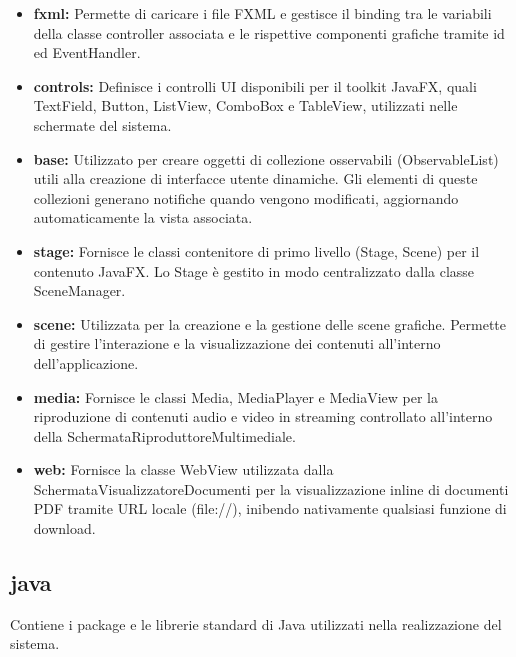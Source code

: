 \documentclass[12pt,a4paper]{article}
\begin{document}
\begin{itemize}
  \item \textbf{fxml:} Permette di caricare i file FXML e gestisce il binding tra le variabili della classe controller associata e le rispettive componenti grafiche tramite id ed EventHandler.
  \item \textbf{controls:} Definisce i controlli UI disponibili per il toolkit JavaFX, quali TextField, Button, ListView, ComboBox e TableView, utilizzati nelle schermate del sistema.
  \item \textbf{base:} Utilizzato per creare oggetti di collezione osservabili (ObservableList) utili alla creazione di interfacce utente dinamiche. Gli elementi di queste collezioni generano notifiche quando vengono modificati, aggiornando automaticamente la vista associata.
  \item \textbf{stage:} Fornisce le classi contenitore di primo livello (Stage, Scene) per il contenuto JavaFX. Lo Stage è gestito in modo centralizzato dalla classe SceneManager.
  \item \textbf{scene:} Utilizzata per la creazione e la gestione delle scene grafiche. Permette di gestire l'interazione e la visualizzazione dei contenuti all'interno dell'applicazione.
  \item \textbf{media:} Fornisce le classi Media, MediaPlayer e MediaView per la riproduzione di contenuti audio e video in streaming controllato all'interno della SchermataRiproduttoreMultimediale.
  \item \textbf{web:} Fornisce la classe WebView utilizzata dalla SchermataVisualizzatoreDocumenti per la visualizzazione inline di documenti PDF tramite URL locale (file://), inibendo nativamente qualsiasi funzione di download.
\end{itemize}

\subsection{java}

Contiene i package e le librerie standard di Java utilizzati nella realizzazione del sistema.
\end{document}
